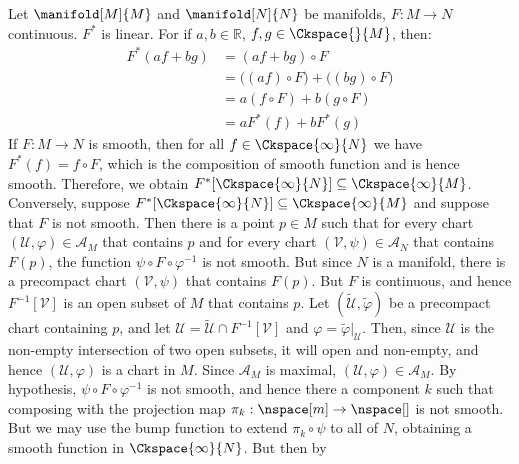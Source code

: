     \begin{solution}
        Let $\manifold[M]{M}$ and $\manifold[N]{N}$ be manifolds,
        $F:M\rightarrow{N}$ continuous. $F^{*}$ is linear. For if
        $a,b\in\mathbb{R}$, $f,g\in\Ckspace{}{M}$, then:
        \begin{subequations}
            \begin{align}
                F^{*}(af+bg)&=(af+bg)\circ{F}\\
                &=\big((af)\circ{F}\big)+\big((bg)\circ{F}\big)\\
                &=a(f\circ{F})+b(g\circ{F})\\
                &=aF^{*}(f)+bF^{*}(g)
            \end{align}
        \end{subequations}
        If $F:M\rightarrow{N}$ is smooth, then for all
        $f\in\Ckspace{\infty}{N}$ we have $F^{*}(f)=f\circ{F}$, which is the
        composition of smooth function and is hence smooth. Therefore, we
        obtain $F^{*}[\Ckspace{\infty}{N}]\subseteq\Ckspace{\infty}{M}$.
        Conversely, suppose
        $F^{*}[\Ckspace{\infty}{N}]\subseteq\Ckspace{\infty}{M}$ and suppose
        that $F$ is not smooth. Then there is a point $p\in{M}$ such that
        for every chart $(\mathcal{U},\varphi)\in\mathcal{A}_{M}$ that
        contains $p$ and for every chart
        $(\mathcal{V},\psi)\in\mathcal{A}_{N}$ that contains $F(p)$, the
        function $\psi\circ{F}\circ\varphi^{\minus{1}}$ is not smooth. But
        since $N$ is a manifold, there is a precompact chart
        $(\mathcal{V},\psi)$ that contains $F(p)$. But $F$ is continuous,
        and hence $F^{\minus{1}}[\mathcal{V}]$ is an open subset of $M$ that
        contains $p$. Let $(\tilde{\mathcal{U}},\tilde{\varphi})$ be a
        precompact chart containing $p$, and let
        $\mathcal{U}=\tilde{\mathcal{U}}\cap{F}^{\minus{1}}[\mathcal{V}]$
        and $\varphi=\tilde{\varphi}|_{\mathcal{U}}$. Then, since
        $\mathcal{U}$ is the non-empty intersection of two open subsets,
        it will open and non-empty, and hence $(\mathcal{U},\varphi)$
        is a chart in $M$. Since $\mathcal{A}_{M}$ is maximal,
        $(\mathcal{U},\varphi)\in\mathcal{A}_{M}$. By hypothesis,
        $\psi\circ{F}\circ\varphi^{\minus{1}}$ is not smooth, and hence
        there a component $k$ such that composing with the projection map
        $\pi_{k}:\nspace[m]\rightarrow\nspace[]$ is not smooth. But we may
        use the bump function to extend $\pi_{k}\circ\psi$ to all of $N$,
        obtaining a smooth function in $\Ckspace{\infty}{N}$. But then by

\end{solution}

